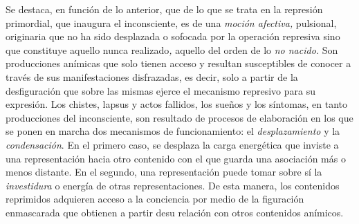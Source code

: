 Se destaca, en función de lo anterior, que de lo que se trata en la
represión primordial, que inaugura el inconsciente, es de una
\emph{moción afectiva,} pulsional, originaria que no ha sido desplazada
o sofocada por la operación represiva sino que constituye aquello nunca
realizado\emph{,} aquello del orden de lo \emph{no nacido.} Son
producciones anímicas que solo tienen acceso y resultan susceptibles de
conocer a través de sus manifestaciones disfrazadas, es decir, solo a
partir de la desfiguración que sobre las mismas ejerce el mecanismo
represivo para su expresión. Los chistes, lapsus y actos fallidos, los
sueños y los síntomas, en tanto producciones del inconsciente, son
resultado de procesos de elaboración en los que se ponen en marcha dos
mecanismos de funcionamiento: el \emph{desplazamiento} y la
\emph{condensación}. En el primero caso, se desplaza la carga energética
que inviste a una representación hacia otro contenido con el que guarda
una asociación más o menos distante. En el segundo, una representación
puede tomar sobre sí la \emph{investidura} o energía de otras
representaciones. De esta manera, los contenidos reprimidos adquieren
acceso a la conciencia por medio de la figuración enmascarada que
obtienen a partir desu relación con otros contenidos anímicos.

